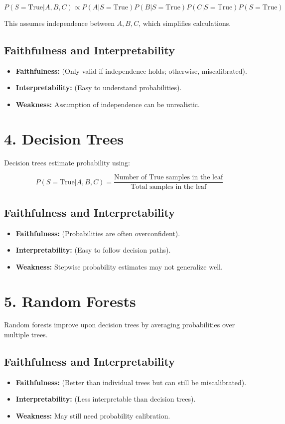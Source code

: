 \documentclass{article}
\begin{document}
\[
P(S = \text{True} | A, B, C) \propto P(A | S = \text{True}) P(B | S = \text{True}) P(C | S = \text{True}) P(S = \text{True})
\]

This assumes independence between \( A, B, C \), which simplifies calculations.

\subsection{Faithfulness and Interpretability}
\begin{itemize}
    \item \textbf{Faithfulness:}  (Only valid if independence holds; otherwise, miscalibrated).
    \item \textbf{Interpretability:}  (Easy to understand probabilities).
    \item \textbf{Weakness:} Assumption of independence can be unrealistic.
\end{itemize}

\section{4. Decision Trees}
Decision trees estimate probability using:

\[
P(S = \text{True} | A, B, C) = \frac{\text{Number of True samples in the leaf}}{\text{Total samples in the leaf}}
\]

\subsection{Faithfulness and Interpretability}
\begin{itemize}
    \item \textbf{Faithfulness:}  (Probabilities are often overconfident).
    \item \textbf{Interpretability:}  (Easy to follow decision paths).
    \item \textbf{Weakness:} Stepwise probability estimates may not generalize well.
\end{itemize}

\section{5. Random Forests}
Random forests improve upon decision trees by averaging probabilities over multiple trees.

\subsection{Faithfulness and Interpretability}
\begin{itemize}
    \item \textbf{Faithfulness:}  (Better than individual trees but can still be miscalibrated).
    \item \textbf{Interpretability:}  (Less interpretable than decision trees).
    \item \textbf{Weakness:} May still need probability calibration.
\end{itemize}
\end{document}

